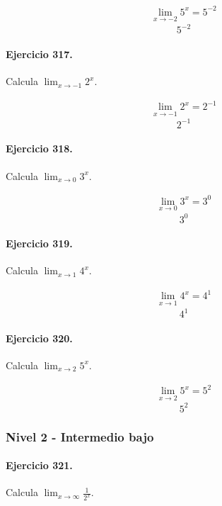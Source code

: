 \documentclass[11pt,a4paper]{article}
\begin{document}
\[
\begin{aligned}
\lim_{x\to -2}5^x=5^{-2}
\end{aligned}
\]
\[\boxed{5^{-2}}\]


\paragraph{Ejercicio 317.} Calcula $\displaystyle\lim_{x\to -1}2^x$.

\[
\begin{aligned}
\lim_{x\to -1}2^x=2^{-1}
\end{aligned}
\]
\[\boxed{2^{-1}}\]


\paragraph{Ejercicio 318.} Calcula $\displaystyle\lim_{x\to 0}3^x$.

\[
\begin{aligned}
\lim_{x\to 0}3^x=3^{0}
\end{aligned}
\]
\[\boxed{3^{0}}\]


\paragraph{Ejercicio 319.} Calcula $\displaystyle\lim_{x\to 1}4^x$.

\[
\begin{aligned}
\lim_{x\to 1}4^x=4^{1}
\end{aligned}
\]
\[\boxed{4^{1}}\]


\paragraph{Ejercicio 320.} Calcula $\displaystyle\lim_{x\to 2}5^x$.

\[
\begin{aligned}
\lim_{x\to 2}5^x=5^{2}
\end{aligned}
\]
\[\boxed{5^{2}}\]


\newpage

\subsubsection*{Nivel 2 - Intermedio bajo}

\paragraph{Ejercicio 321.} Calcula $\displaystyle\lim_{x\to\infty}\frac{1}{2^x}$.
\end{document}
